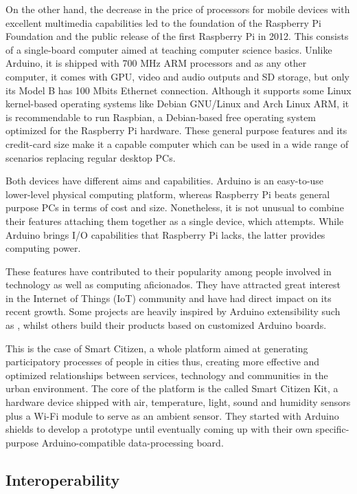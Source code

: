 On the other hand, the decrease in the price of processors for mobile devices with excellent multimedia capabilities led to the foundation of the Raspberry Pi Foundation and the public release of the first Raspberry Pi in 2012. This consists of a single-board computer aimed at teaching computer science basics. Unlike Arduino, it is shipped with 700 MHz ARM processors and as any other computer, it comes with GPU, video and audio outputs and SD storage, but only its Model B has 100 Mbits Ethernet connection. Although it supports some Linux kernel-based operating systems like Debian GNU/Linux and Arch Linux ARM, it is recommendable to run Raspbian, a Debian-based free operating system optimized for the Raspberry Pi hardware. These general purpose features and its credit-card size make it a capable computer which can be used in a wide range of scenarios replacing regular desktop PCs.

Both devices have different aims and capabilities. Arduino is an easy-to-use lower-level physical computing platform, whereas Raspberry Pi beats general purpose PCs in terms of cost and size. Nonetheless, it is not unusual to combine their features attaching them together as a single device, which \cite{Arduberry} attempts. While Arduino brings I/O capabilities that Raspberry Pi lacks, the latter provides computing power.

These features have contributed to their popularity among people involved in technology as well as computing aficionados. They have attracted great interest in the Internet of Things (IoT) community and have had direct impact on its recent growth. Some projects are heavily inspired by Arduino extensibility such as \cite{Thinking-Things}, whilst others build their products based on customized Arduino boards.

This is the case of Smart Citizen, a whole platform aimed at generating participatory processes of people in cities thus, creating more effective and optimized relationships between services, technology and communities in the urban environment. The core of the platform is the called Smart Citizen Kit, a hardware device shipped with air, temperature, light, sound and humidity sensors plus a Wi-Fi module to serve as an ambient sensor. They started with Arduino shields to develop a prototype until eventually coming up with their own specific-purpose Arduino-compatible data-processing board.

\subsection{Interoperability} \label{interoperability}

